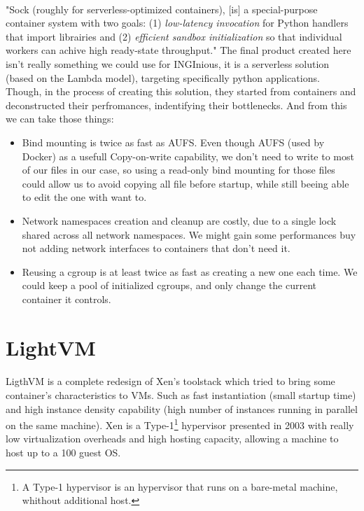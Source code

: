 \paragraph{}"Sock (roughly for serverless-optimized containers), [is] a special-purpose container system with two goals: (1) \textit{low-latency invocation} for Python handlers that import librairies and (2) \textit{efficient sandbox initialization} so that individual workers can achive high ready-state throughput." \cite{oakes2018sock}  The final product created here isn't really something we could use for INGInious, it is a serverless solution (based on the Lambda model), targeting specifically python applications.  Though, in the process of creating this solution, they started from containers and deconstructed their perfromances, indentifying their bottlenecks.  And from this we can take those things:
\begin{itemize}
\renewcommand\labelitemi{--}
  \item Bind mounting is twice as fast as AUFS.  Even though AUFS (used by Docker) as a usefull Copy-on-write capability, we don't need to write to most of our files in our case, so using a read-only bind mounting for those files could allow us to avoid copying all file before startup, while still beeing able to edit the one with want to.
  \item Network namespaces creation and cleanup are costly, due to a single lock shared across all network namespaces.  We might gain some performances buy not adding network interfaces to containers that don't need it.
  \item Reusing a cgroup is at least twice as fast as creating a new one each time.  We could keep a pool of initialized cgroups, and only change the current container it controls.
\end{itemize}

\section{LightVM} 
\paragraph{}LigthVM is a complete redesign of Xen's toolstack which tried to bring some container's characteristics to VMs.  Such as fast instantiation (small startup time) and high instance density capability (high number of instances running in parallel on the same machine).\cite{manco2017my}  Xen is a Type-1\footnote{A Type-1 hypervisor is an hypervisor that runs on a bare-metal machine, whithout additional host.} hypervisor presented in 2003 with really low virtualization overheads and high hosting capacity, allowing a machine to host up to a 100 guest OS.\cite{barham2003xen}  
